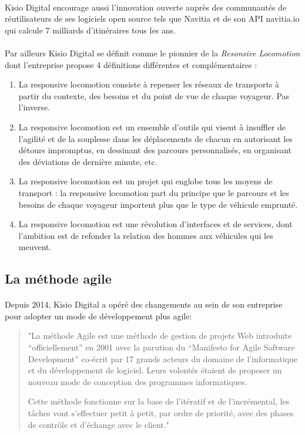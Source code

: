 \documentclass[a4paper]{report}
\begin{document}
\paragraph{} Kisio Digital encourage aussi l'innovation ouverte auprès des communautés de réutilisateurs de ses logiciels open source tels que Navitia et de son API navitia.io qui calcule 7 milliards d'itinéraires tous les ans.

\paragraph{} Par ailleurs Kisio Digital se définit comme le pionnier de la \emph{Resonsive Locomotion} dont l'entreprise propose 4 définitions différentes et complémentaires\cite{ref_canal_tp} :

\begin{enumerate}
	\item La responsive locomotion consiste à repenser les réseaux de transports à partir du contexte, des besoins et du point de vue de chaque voyageur. Pas l'inverse.
	\item La responsive locomotion est un ensemble d'outils qui visent à insuffler de l'agilité et de la souplesse dans les déplacements de chacun en autorisant les détours impromptus, en dessinant des parcours personnalisés, en organisant des déviations de dernière minute, etc.
	\item La responsive locomotion est un projet qui englobe tous les moyens de transport : la responsive locomotion part du principe que le parcours et les besoins de chaque voyageur importent plus que le type de véhicule emprunté.
	\item La responsive locomotion est une révolution d'interfaces et de services, dont l'ambition est de refonder la relation des hommes aux véhicules qui les meuvent.
\end{enumerate}

\subsection{La méthode agile}

\paragraph {}Depuis 2014, Kisio Digital a opéré des changements au sein de son entreprise pour adopter un mode de développement plus agile:

\begin{quote}
"La méthode Agile est une méthode de gestion de projets Web introduite “officiellement” en 2001 avec la parution du “Manifesto for Agile Software Development” co-écrit par 17 grands acteurs du domaine de l’informatique et du développement de logiciel. Leurs volontés étaient de proposer un nouveau mode de conception des programmes informatiques.

Cette méthode fonctionne sur la base de l'itératif et de l’incrémental, les tâches vont s’effectuer petit à petit, par ordre de priorité, avec des  phases de contrôle et d’échange avec le client."\cite{ref_agile}
\end{quote}
\end{document}
